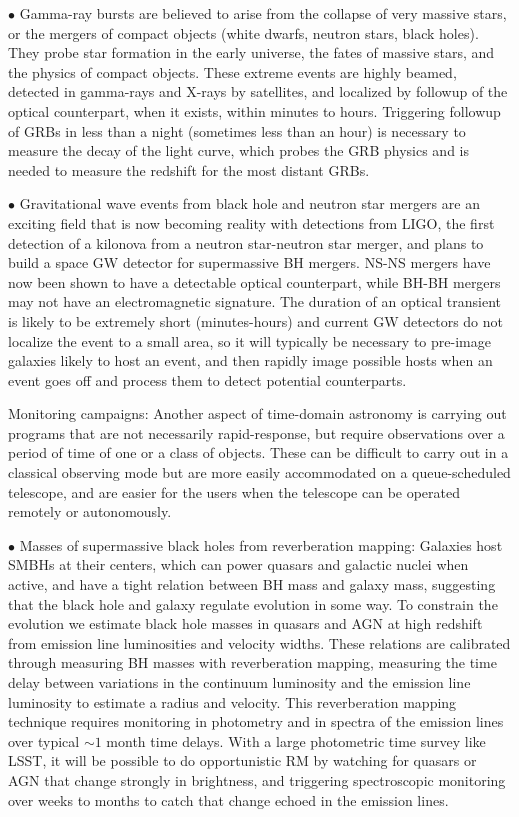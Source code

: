 \documentclass[]{spie}  %
\begin{document}
$\bullet$ Gamma-ray bursts are believed to arise from the collapse of very massive stars, or the mergers of compact objects (white dwarfs, neutron stars, black holes). They probe star formation in the early universe, the fates of massive stars, and the physics of compact objects. These extreme events are highly beamed, detected in gamma-rays and X-rays by satellites, and localized by followup of the optical counterpart, when it exists, within minutes to hours\cite{Fong16}. Triggering followup of GRBs in less than a night (sometimes less than an hour) is necessary to measure the decay of the light curve, which probes the GRB physics and is needed to measure the redshift for the most distant GRBs.  

$\bullet$ Gravitational wave events from black hole and neutron star mergers are an exciting field that is now becoming reality with detections from LIGO, the first detection of a kilonova from a neutron star-neutron star merger\cite{Soares-Santos17, Valenti17, Kilpatrick17}, and plans to build a space GW detector for supermassive BH mergers. NS-NS mergers have now been shown to have a detectable optical counterpart, while BH-BH mergers may not have an electromagnetic signature. The duration of an optical transient is likely to be extremely short (minutes-hours) and current GW detectors do not localize the event to a small area, so it will typically be necessary to pre-image galaxies likely to host an event, and then rapidly image possible hosts when an event goes off and process them to detect potential counterparts.

Monitoring campaigns: Another aspect of time-domain astronomy is carrying out programs that are not necessarily rapid-response, but require observations over a period of time of one or a class of objects. These can be difficult to carry out in a classical observing mode but are more easily accommodated on a queue-scheduled telescope, and are easier for the users when the telescope can be operated remotely or autonomously.

$\bullet$ Masses of supermassive black holes from reverberation mapping: Galaxies host SMBHs at their centers, which can power quasars and galactic nuclei when active, and have a tight relation between BH mass and galaxy mass, suggesting that the black hole and galaxy regulate evolution in some way. To constrain the evolution we estimate black hole masses in quasars and AGN at high redshift from emission line luminosities and velocity widths. These relations are calibrated through measuring BH masses with reverberation mapping, measuring the time delay between variations in the continuum luminosity and the emission line luminosity to estimate a radius and velocity. This reverberation mapping technique requires monitoring in photometry and in spectra of the emission lines over typical $\sim 1$ month time delays\cite{Grier17}. With a large photometric time survey like LSST, it will be possible to do opportunistic RM by watching for quasars or AGN that change strongly in brightness, and triggering spectroscopic monitoring over weeks to months to catch that change echoed in the emission lines. 
\end{document}
